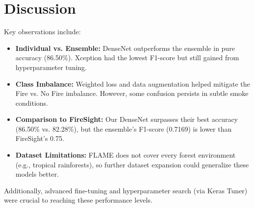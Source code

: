 \section{Discussion}
\label{sec:discussion}

Key observations include:

\begin{itemize}
    \item \textbf{Individual vs. Ensemble:} 
      DenseNet outperforms the ensemble in pure accuracy (86.50\%). Xception had the
      lowest F1-score but still gained from hyperparameter tuning.
    \item \textbf{Class Imbalance:} 
      Weighted loss and data augmentation helped mitigate the Fire vs. No Fire imbalance.
      However, some confusion persists in subtle smoke conditions.
    \item \textbf{Comparison to FireSight:} 
      Our DenseNet surpasses their best accuracy (86.50\% vs. 82.28\%), but the ensemble’s
      F1-score (0.7169) is lower than FireSight’s 0.75.
    \item \textbf{Dataset Limitations:} 
      FLAME does not cover every forest environment (e.g., tropical rainforests), so
      further dataset expansion could generalize these models better.
\end{itemize}

Additionally, advanced fine-tuning and hyperparameter search (via Keras Tuner) were crucial
to reaching these performance levels.
